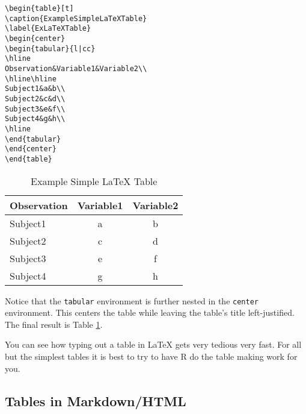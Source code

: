 \begin{knitrout}
\color{fgcolor}\begin{kframe}
\begin{alltt}
\textbackslash{}begin\{table\}[t]
    \textbackslash{}caption\{Example Simple LaTeX Table\}
    \textbackslash{}label\{ExLaTeXTable\}
    \textbackslash{}begin\{center\}
        \textbackslash{}begin\{tabular\}\{l | c c\}
            \textbackslash{}hline
            Observation & Variable1 & Variable2 \textbackslash{}\textbackslash{}
            \textbackslash{}hline \textbackslash{}hline
            Subject1 & a & b \textbackslash{}\textbackslash{}
            Subject2 & c & d \textbackslash{}\textbackslash{}
            Subject3 & e & f \textbackslash{}\textbackslash{}
            Subject4 & g & h \textbackslash{}\textbackslash{}
            \textbackslash{}hline
        \textbackslash{}end\{tabular\}
    \textbackslash{}end\{center\}
\textbackslash{}end\{table\}
\end{alltt}
\end{kframe}
\end{knitrout}


\begin{table}[t]
    \caption{Example Simple LaTeX Table}
    \label{ExLaTeXTable}
    \begin{center}
        \begin{tabular}{l | c c}
            \hline
            Observation & Variable1 & Variable2 \\
            \hline \hline
            Subject1 & a & b \\
            Subject2 & c & d \\
            Subject3 & e & f \\
            Subject4 & g & h \\
            \hline
        \end{tabular}
    \end{center}
\end{table}

\noindent Notice that the \texttt{tabular} environment is further nested in the \texttt{center} environment. This centers the table while leaving the table's title left-justified. The final result is Table \ref{ExLaTeXTable}.

You can see how typing out a table in LaTeX gets very tedious very fast. For all but the simplest tables it is best to try to have R do the table making work for you.

\subsection{Tables in Markdown/HTML}

